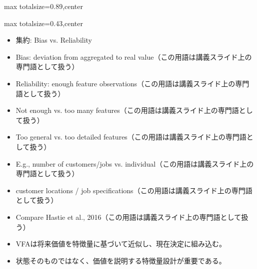 \begin{minipage}[t]{0.58\textwidth}
\begin{adjustbox}{max totalsize={\textwidth}{0.89\textheight},center}
\begin{minipage}{\textwidth}
\end{minipage}
\end{adjustbox}
\end{minipage}


\clearpage
{}
\begin{minipage}[t]{0.405\textwidth}
\begin{adjustbox}{max totalsize={\textwidth}{0.43\textheight},center}
\begin{minipage}{\textwidth}\scriptsize
{}\begin{itemize}
\item 集約: Bias vs. Reliability
\item Bias: deviation from aggregated to real value（この用語は講義スライド上の専門語として扱う）
\item Reliability: enough feature observations（この用語は講義スライド上の専門語として扱う）
\item Not enough vs. too many features（この用語は講義スライド上の専門語として扱う）
\item Too general vs. too detailed features（この用語は講義スライド上の専門語として扱う）
\item E.g., number of customers/jobs vs. individual（この用語は講義スライド上の専門語として扱う）
\item customer locations / job specifications（この用語は講義スライド上の専門語として扱う）
\item Compare Hastie et al., 2016（この用語は講義スライド上の専門語として扱う）
\end{itemize}\begin{itemize}
\item VFAは将来価値を特徴量に基づいて近似し、現在決定に組み込む。
\item 状態そのものではなく、価値を説明する特徴量設計が重要である。
\end{itemize}
\end{minipage}
\end{adjustbox}
\end{minipage}\hfill
